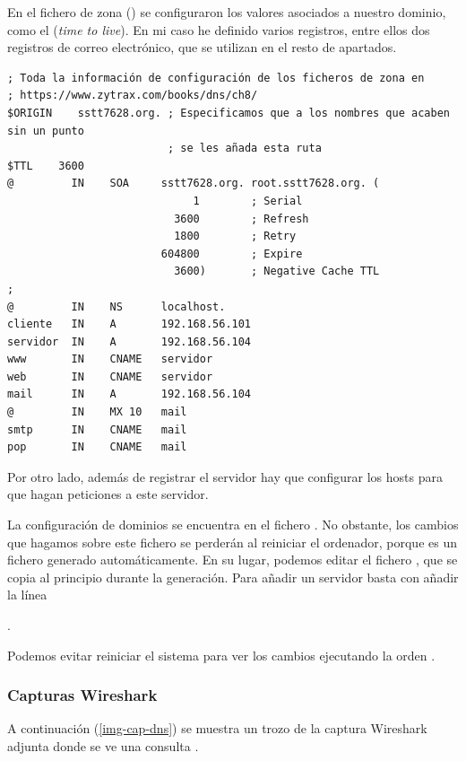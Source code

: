 En el fichero de zona () se configuraron los valores asociados a nuestro dominio, como el  (\textit{time to live}). En mi caso he definido varios registros, entre ellos dos registros de correo electrónico, que se utilizan en el resto de apartados.
\begin{lstlisting}[title=Fichero \file{/etc/bind/db.sstt7628.org.zone}]
; Toda la información de configuración de los ficheros de zona en
; https://www.zytrax.com/books/dns/ch8/
$ORIGIN    sstt7628.org. ; Especificamos que a los nombres que acaben sin un punto
                         ; se les añada esta ruta
$TTL    3600
@         IN    SOA     sstt7628.org. root.sstt7628.org. (
                             1        ; Serial
                          3600        ; Refresh
                          1800        ; Retry
                        604800        ; Expire
                          3600)       ; Negative Cache TTL
;
@         IN    NS      localhost.
cliente   IN    A       192.168.56.101
servidor  IN    A       192.168.56.104
www       IN    CNAME   servidor
web       IN    CNAME   servidor
mail      IN    A       192.168.56.104
@         IN    MX 10   mail
smtp      IN    CNAME   mail
pop       IN    CNAME   mail
\end{lstlisting}

Por otro lado, además de registrar el servidor {\DNS} hay que configurar los hosts para que hagan peticiones a este servidor.

La configuración de dominios {\DNS} se encuentra en el fichero . No obstante, los cambios que hagamos sobre este fichero se perderán al reiniciar el ordenador, porque es un fichero generado automáticamente. En su lugar, podemos editar el fichero , que se copia al principio durante la generación. Para añadir un servidor {\DNS} basta con añadir la línea

\begin{center}.\end{center}

Podemos evitar reiniciar el sistema para ver los cambios ejecutando la orden .

\subsubsection{Capturas Wireshark}
A continuación (\cref{img-cap-dns}) se muestra un trozo de la captura Wireshark adjunta donde se ve una consulta {\DNS}.


